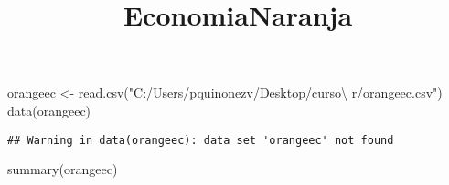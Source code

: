 \documentclass[
]{article}
\title{EconomiaNaranja}
\author{}
\date{\vspace{-2.5em}}
\newenvironment{Shaded}{\begin{snugshade}}{\end{snugshade}}
\newcommand{\FunctionTok}[1]{\textcolor[rgb]{0.00,0.00,0.00}{#1}}
\newcommand{\NormalTok}[1]{#1}
\newcommand{\OtherTok}[1]{\textcolor[rgb]{0.56,0.35,0.01}{#1}}
\newcommand{\StringTok}[1]{\textcolor[rgb]{0.31,0.60,0.02}{#1}}
\begin{document}
\maketitle

\begin{Shaded}
\begin{Highlighting}[]
\NormalTok{orangeec }\OtherTok{\textless{}{-}} \FunctionTok{read.csv}\NormalTok{(}\StringTok{"C:/Users/pquinonezv/Desktop/curso\textbackslash{} r/orangeec.csv"}\NormalTok{)}
\FunctionTok{data}\NormalTok{(orangeec)}
\end{Highlighting}
\end{Shaded}

\begin{verbatim}
## Warning in data(orangeec): data set 'orangeec' not found
\end{verbatim}

\begin{Shaded}
\begin{Highlighting}[]
\FunctionTok{summary}\NormalTok{(orangeec)}
\end{Highlighting}
\end{Shaded}
\end{document}
